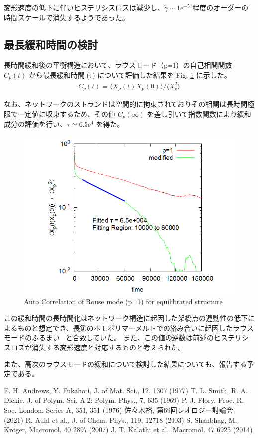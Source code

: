 \documentclass[uplatex,10pt,a4paper,twocolumn]{jsarticle}
\begin{document}
変形速度の低下に伴いヒステリシスロスは減少し、$\dot{\gamma} \sim 1e^{-5}$ 程度のオーダーの時間スケールで消失するようであった。

\subsection{最長緩和時間の検討}
長時間緩和後の平衡構造において、ラウスモード（p=1）の自己相関関数 $C_p(t)$ から最長緩和時間 ($\tau$) について評価した結果を Fig. \ref{fig:ac-xp} に示した。
\begin{align*}
	C_p(t) = \langle X_p(t)X_p(0) \rangle/\langle X_p^2 \rangle
\end{align*}

なお、ネットワークのストランドは空間的に拘束されておりその相関は長時間極限で一定値に収束するため、その値 $C_p(\infty)$ を差し引いて指数関数により緩和成分の評価を行い、$\tau \simeq 6.5e^{4}$ を得た。

\vspace{-2mm}
\begin{figure}[htb]
\centering
	\includegraphics[width=.44\textwidth]{Xp_1_org.png}
\caption{Auto Correlation of Rouse mode (p=1) for equilibrated structure}
\label{fig:ac-xp}
\end{figure}
\vspace{-5mm}
この緩和時間の長時間化はネットワーク構造に起因した架橋点の運動性の低下によるものと想定でき、長鎖のホモポリマーメルトでの絡み合いに起因したラウスモードのふるまい~\cite{rubinstein} と合致していた。
また、この値の逆数は前述のヒステリシスロスが消失する変形速度と対応するものと考えられた。


また、高次のラウスモードの緩和について検討した結果についても、報告する予定である。

\begin{thebibliography}{99}
     E. H. Andrews, Y. Fukahori, J. of Mat. Sci., 12, 1307 (1977)
     T. L. Smith, R. A. Dickie, J. of Polym. Sci. A-2: Polym. Phys., 7, 635 (1969)
     P. J. Flory, Proc. R. Soc. London. Series A, 351, 351 (1976)
     佐々木裕, 第69回レオロジー討論会 (2021)
     R. Auhl et al., J. of Chem. Phys., 119, 12718 (2003)
     S. Shanbhag, M. Kr\"{o}ger, Macromol. 40 2897 (2007)
     J. T. Kalathi et al., Macromol. 47 6925 (2014)
\end{thebibliography}
\end{document}
